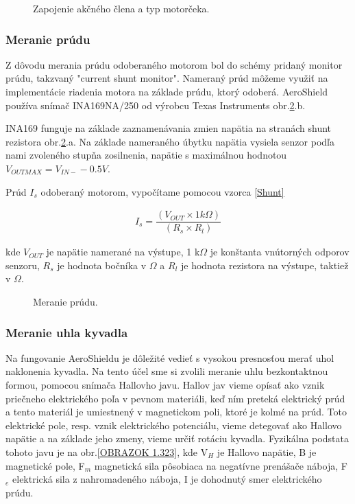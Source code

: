\begin{figure}[!tbh]
	\hfill
	\hfill
	\hfill
	\caption{Zapojenie akčného člena a typ motorčeka.}\label{OBRAZOK 2.3}
\end{figure}


\subsubsection{Meranie prúdu}
\label{merprud}

Z dôvodu merania prúdu odoberaného motorom bol do schémy pridaný monitor prúdu, takzvaný "current shunt monitor". Nameraný prúd môžeme využiť na implementácie riadenia motora na základe prúdu, ktorý odoberá. AeroShield používa snímač INA169NA/250 od výrobcu Texas Instruments obr.\ref{OBRAZOK 2.3.2}.b.

INA169 funguje na základe zaznamenávania zmien napätia na stranách shunt rezistora obr.\ref{OBRAZOK 2.3.2}.a. Na základe nameraného úbytku napätia vysiela senzor podľa nami zvoleného stupňa zosilnenia, napätie s maximálnou hodnotou $V_{OUTMAX} = V_{IN-} - 0.5 V $.

Prúd $I_{s}$ odoberaný motorom, vypočítame pomocou vzorca \ref{Shunt}

\begin{align}
	\label{Shunt}
 I_{s} = \dfrac{(V_{OUT} \times  1 k\Omega)}{(R_{s} \times R_{l})}
\end{align}

kde $V_{OUT}$ je napätie namerané na výstupe, 1 k$\Omega$ je konštanta vnútorných odporov senzoru, $R_{s}$ je hodnota bočníka v $\Omega$ a $R_{l}$ je hodnota rezistora na výstupe, taktiež v $\Omega$\cite{INA}.

\begin{figure}[!tbh]
	\hfill
	\hfill
	\hfill
	\caption{Meranie prúdu.}\label{OBRAZOK 2.3.2}
\end{figure}


\subsubsection{Meranie uhla kyvadla}
\label{meruhl}

Na fungovanie AeroShieldu je dôležité vedieť s vysokou presnosťou merať uhol naklonenia kyvadla. Na tento účel sme si zvolili meranie uhlu bezkontaktnou formou, pomocou snímača Hallovho javu. Hallov jav vieme opísať ako vznik priečneho elektrického poľa v pevnom materiáli, keď ním preteká elektrický prúd a tento materiál je umiestnený v magnetickom poli, ktoré je kolmé na prúd\cite{Hall}. Toto elektrické pole, resp. vznik elektrického potenciálu, vieme detegovať ako Hallovo napätie a na základe jeho zmeny, vieme určiť rotáciu kyvadla. Fyzikálna podstata tohoto javu je na obr.\ref{OBRAZOK 1.323}, kde V$_H$ je Hallovo napätie, B je magnetické pole, F$_m$ magnetická sila pôsobiaca na negatívne prenášače náboja, F$_e$ elektrická sila z nahromadeného náboja, I je dohodnutý smer elektrického prúdu. 

